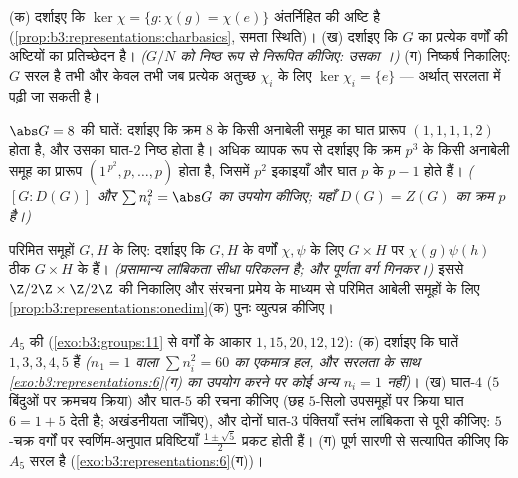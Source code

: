 \begin{exercise}[$\star\star$]\label{exo:b3:representations:6}
(क) दर्शाइए कि $\ker\chi = \{g : \chi(g) = \chi(e)\}$ अंतर्निहित  की अष्टि है (\cref{prop:b3:representations:charbasics}, समता
स्थिति)।
(ख) दर्शाइए कि $G$ का प्रत्येक   वर्णों
की अष्टियों का प्रतिच्छेदन है। \emph{($G/N$ को निष्ठ रूप से
निरूपित कीजिए: उसका ।)}
(ग) निष्कर्ष निकालिए: $G$ सरल है तभी और केवल तभी जब प्रत्येक
अतुच्छ  $\chi_i$ के लिए $\ker\chi_i = \{e\}$ --- अर्थात् सरलता 
में पढ़ी जा सकती है।
\end{exercise}

\begin{exercise}[$\star\star$]\label{exo:b3:representations:7}
$\abs G = 8$ की घातें: दर्शाइए कि क्रम $8$ के किसी अनाबेली समूह का घात
प्रारूप $(1,1,1,1,2)$ होता है, और उसका घात-$2$  निष्ठ होता है।
अधिक व्यापक रूप से दर्शाइए कि क्रम $p^3$ के किसी अनाबेली समूह का
प्रारूप $(1^{\,p^2},
p, \dots, p)$ होता है, जिसमें $p^2$ इकाइयाँ और घात $p$ के
$p - 1$  होते हैं। \emph{($[G : D(G)]$ और $\sum n_i^2 = \abs G$ का उपयोग कीजिए; यहाँ
$D(G) = Z(G)$ का क्रम $p$ है।)}
\end{exercise}

\begin{exercise}[$\star\star\star$]\label{exo:b3:representations:8}
परिमित समूहों $G, H$ के लिए: दर्शाइए कि $G, H$ के  वर्णों
$\chi, \psi$ के लिए $G \times H$ पर  $\chi(g)\psi(h)$ ठीक $G \times H$ के  
हैं। \emph{(प्रसामान्य लांबिकता सीधा परिकलन है; और पूर्णता वर्ग
गिनकर।)} इससे $\Z/2\Z \times \Z/2\Z$ की  निकालिए और संरचना प्रमेय के
माध्यम से परिमित आबेली समूहों के लिए \cref{prop:b3:representations:onedim}(क) पुनः व्युत्पन्न
कीजिए।
\end{exercise}

\begin{exercise}[$\star\star\star$]\label{exo:b3:representations:9}
$A_5$ की  (\cref{exo:b3:groups:11} से वर्गों के आकार $1, 15, 20, 12,
12$):
(क) दर्शाइए कि घातें $1, 3, 3, 4, 5$ हैं \emph{($n_1 = 1$ वाला $\sum n_i^2 = 60$ का
एकमात्र हल, और सरलता के साथ \cref{exo:b3:representations:6}(ग) का उपयोग करने पर कोई अन्य
$n_i = 1$ नहीं)}।
(ख) घात-$4$  ($5$ बिंदुओं पर क्रमचय क्रिया) और घात-$5$
 की रचना कीजिए (छह $5$-सिलो उपसमूहों पर क्रिया घात $6 = 1 + 5$
देती है; अखंडनीयता जाँचिए), और दोनों घात-$3$ पंक्तियाँ स्तंभ
लांबिकता से पूरी कीजिए: $5$-चक्र वर्गों पर स्वर्णिम-अनुपात
प्रविष्टियाँ $\frac{1\pm\sqrt5}2$ प्रकट होती हैं।
(ग) पूर्ण सारणी से सत्यापित कीजिए कि $A_5$ सरल है (\cref{exo:b3:representations:6}(ग))।
\end{exercise}

